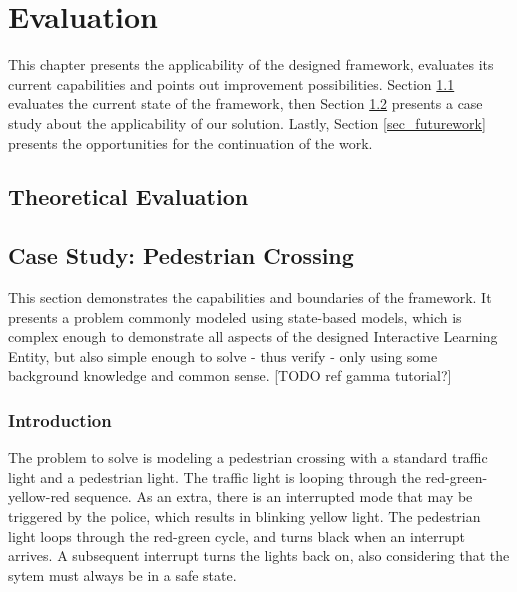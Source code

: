 \chapter{Evaluation}
This chapter presents the applicability of the designed framework, evaluates its current capabilities and points out improvement possibilities. Section \ref{sec_theoeval} evaluates the current state of the framework, then Section \ref{sec_casestudy} presents a case study about the applicability of our solution. Lastly, Section \ref{sec_futurework} presents the opportunities for the continuation of the work.

\section{Theoretical Evaluation} \label{sec_theoeval}

\section{Case Study: Pedestrian Crossing} \label{sec_casestudy}
This section demonstrates the capabilities and boundaries of the framework. It presents a problem commonly modeled using state-based models, which is complex enough to demonstrate all aspects of the designed Interactive Learning Entity, but also simple enough to solve - thus verify - only using some background knowledge and common sense. [TODO ref gamma tutorial?]

\subsection{Introduction} \label{subs_casestudyintro}

The problem to solve is modeling a pedestrian crossing with a standard traffic light and a pedestrian light. The traffic light is looping through the red-green-yellow-red sequence. As an extra, there is an interrupted mode that may be triggered by the police, which results in blinking yellow light. The pedestrian light loops through the red-green cycle, and turns black when an interrupt arrives. A subsequent interrupt turns the lights back on, also considering that the sytem must always be in a safe state.

